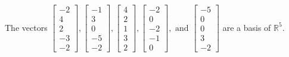 \begin{exercise}
\begin{exerciseStatement}
  \end{exerciseStatement}
  \begin{exerciseAnswer}
   The vectors \(\left[\begin{array}{r}
-2 \\
4 \\
2 \\
-3 \\
-2
\end{array}\right] , \left[\begin{array}{r}
-1 \\
3 \\
0 \\
-5 \\
-2
\end{array}\right] , \left[\begin{array}{r}
4 \\
2 \\
1 \\
3 \\
2
\end{array}\right] , \left[\begin{array}{r}
-2 \\
0 \\
-2 \\
-1 \\
0
\end{array}\right] , \text{ and } \left[\begin{array}{r}
-5 \\
0 \\
0 \\
3 \\
-2
\end{array}\right]\) 
  	 are  a basis of \(\mathbb{R}^5\).
  


  \end{exerciseAnswer}
\end{exercise}